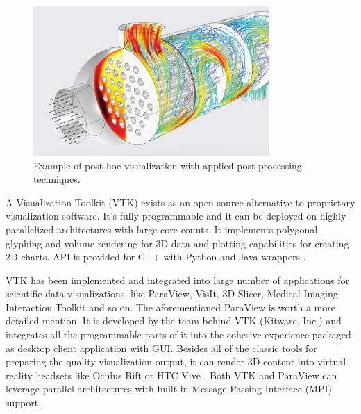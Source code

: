 \begin{figure}[!ht]
	\centering
	\includegraphics[width=0.8\textwidth]{figures/comsol-post-hoc-viz.jpg}
	\caption{Example of post-hoc visualization with applied post-processing techniques.}
	\label{fig:comsol-post-hoc-viz}
\end{figure}

A Visualization Toolkit (VTK) exists as an open-source alternative to proprietary visualization software. It's fully programmable and it can be deployed on highly parallelized architectures with large core counts. It implements polygonal, glyphing and volume rendering for 3D data and plotting capabilities for creating 2D charts. API is provided for C++ with Python and Java wrappers \citep{hanwellVisualizationToolkitVTK2015}.

VTK has been implemented and integrated into large number of applications for scientific data visualizations, like ParaView, VisIt, 3D Slicer, Medical Imaging Interaction Toolkit and so on. The aforementioned ParaView is worth a more detailed mention. It is developed by the team behind VTK (Kitware, Inc.) and integrates all the programmable parts of it into the cohesive experience packaged as desktop client application with GUI. Besides all of the classic tools for preparing the quality visualization output, it can render 3D content into virtual reality headsets like Oculus Rift or HTC Vive \citep{paraview2005}. Both VTK and ParaView can leverage parallel architectures with built-in Message-Passing Interface (MPI) support.


